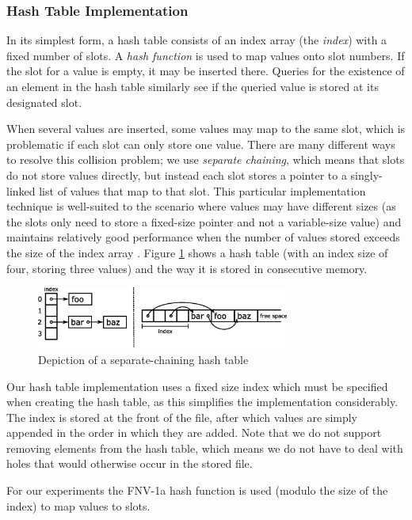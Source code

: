 \documentclass{acm_proc_article-sp}
\begin{document}
\subsubsection{Hash Table Implementation}
In its simplest form, a hash table consists of an
index array (the \emph{index}) with a fixed number of slots. A \emph{hash
function} is used to map values onto slot numbers. If the slot for a value
is empty, it may be inserted there. Queries for the existence of an element in
the hash table similarly see if the queried value is stored at its designated
slot.

When several values are inserted, some values may map to the same slot,
which is problematic if each slot can only store one value. There
are many different ways to resolve this collision problem; we use
\emph{separate chaining}, which means that slots do not store values directly,
but instead each slot stores a pointer to a singly-linked list of values that
map to that slot. This particular implementation technique is well-suited to
the scenario where values may have different sizes (as the slots only need to
store a fixed-size pointer and not a variable-size value) and maintains
relatively good performance when the number of values stored exceeds the size
of the index array \cite{sedgewick1998ac}. Figure \ref{fig-hash-table} shows a
hash table (with an index size of four, storing three values) and the way it
is stored in consecutive memory.

\begin{figure}[t]
\centering
\includegraphics[width=83mm]{hash-table}
\caption{Depiction of a separate-chaining hash table}
\label{fig-hash-table}
\end{figure}

Our hash table implementation uses a fixed size index which must be specified
when creating the hash table, as this simplifies the implementation
considerably. The index is stored at the front of the file, after which values
are simply appended in the order in which they are added. Note that we do not
support removing elements from the hash table, which means we do not have to
deal with holes that would otherwise occur in the stored file.

For our
experiments the FNV-1a hash function \cite{noll2004fnv} is used (modulo the
size of the index) to map values to slots.
\end{document}
